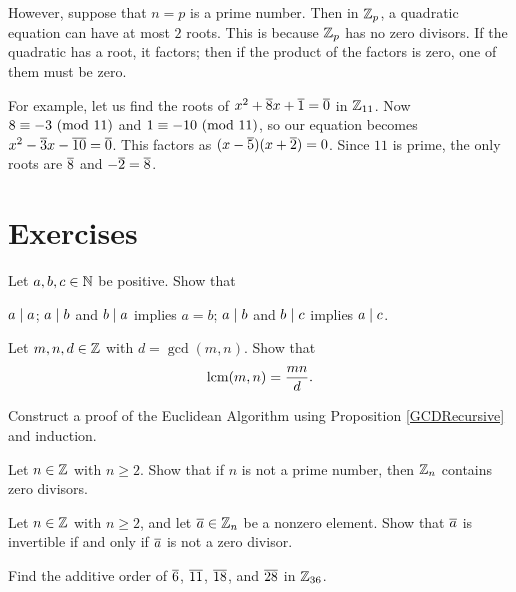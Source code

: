 \documentclass{amsart}
\begin{document}
However, suppose that $n = p$ is a prime number.
Then in $\mathbb{Z}_{p}$, a quadratic equation can have at most $2$ roots.
This is because $\mathbb{Z}_{p}$ has no zero divisors.
If the quadratic has a root, it factors; then if the product of
the factors is zero, one of them must be zero.

For example, let us find the roots of $x^{2} + \overline{8}x + \overline{1} = \overline{0}$ in $\mathbb{Z}_{11}$.
Now $8 \equiv -3 \text{\rm{ (mod }}{11}\text{\rm{)}}$ and $1 \equiv -10 \text{\rm{ (mod }}{11}\text{\rm{)}}$,
so our equation becomes $x^{2} - \overline{3}x - \overline{10} = \overline{0}$.
This factors as $(x-\overline{5})(x+\overline{2}) = 0$.  Since $11$ is prime,
the only roots are $\overline{8}$ and $-\overline{2} = \overline{8}$.

\newpage

\section{Exercises}

\begin{Exc}
Let $a,b,c \in \mathbb{N}$ be positive.  Show that
\begin{itemize}
 $a \mid a$;  $a \mid b$ and $b \mid
a$ implies $a = b$;  $a \mid b$ and $b \mid c$
implies $a \mid c$.
\end{itemize}
\end{Exc}

\begin{Exc}
Let $m,n,d \in \mathbb{Z}$ with $d = \gcd(m,n)$.
Show that %
\[ \text{\rm{lcm}}(m,n) = \frac{mn}{d} . \]
\end{Exc}

\begin{Exc}
Construct a proof of the Euclidean Algorithm using
Proposition \ref{GCDRecursive} and induction.
\end{Exc}

\begin{Exc}
Let $n \in \mathbb{Z}$ with $n \ge 2$.  Show that if $n$ is not a prime number,
then $\mathbb{Z}_{n}$ contains zero divisors.
\end{Exc}

\begin{Exc}
Let $n \in \mathbb{Z}$ with $n \ge 2$, and let $\overline{a} \in \mathbb{Z}_{n}$ be a nonzero element.
Show that $\overline{a}$ is invertible if and only if $\overline{a}$ is not a zero divisor.
\end{Exc}

\begin{Exc}
Find the additive order of $\overline{6}$, $\overline{11}$, $\overline{18}$, and $\overline{28}$ in $\mathbb{Z}_{36}$.
\end{Exc}
\end{document}
